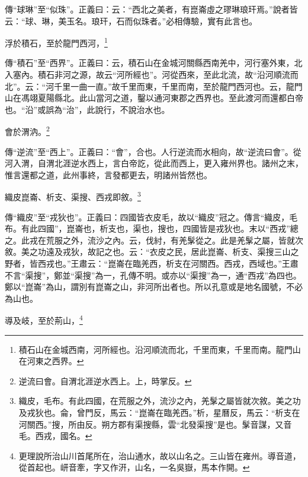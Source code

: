 {\noindent\zhuan{}\fzbyks 傳“球琳”至“似珠”。正義曰：云：“西北之美者，有崑崙虛之璆琳琅玕焉。”說者皆云：“球、琳，美玉名。琅玕，石而似珠者。”必相傳驗，實有此言也。 \par}

浮於積石，至於龍門西河，\footnote{積石山在金城西南，河所經也。沿河順流而北，千里而東，千里而南。龍門山在河東之西界。}

{\noindent\zhuan{}\fzbyks 傳“積石”至“西界”。正義曰：云，積石山在金城河關縣西南羌中，河行塞外東，北入塞內。積石非河之源，故云“河所經也”。河從西來，至此北流，故“沿河順流而北”。云：“河千里一曲一直。”故千里而東，千里而南，至於龍門西河也。云，龍門山在馮翊夏陽縣北。此山當河之道，鑿以通河東郡之西界也。至此渡河而還都白帝也。“沿”或誤為“治”，此說行，不說治水也。 \par}

會於渭汭。\footnote{逆流曰會。自渭北涯逆水西上。上，時掌反。}

{\noindent\zhuan{}\fzbyks 傳“逆流”至“西上”。正義曰：“會”，合也。人行逆流而水相向，故“逆流曰會”。從河入渭，自渭北涯逆水西上，言白帝訖，從此而西上，更入雍州界也。諸州之末，惟言還都之道，此州事終，言發都更去，明諸州皆然也。 \par}

織皮崑崙、析支、渠搜、西戎即敘。\footnote{織皮，毛布。有此四國，在荒服之外，流沙之內，羌髳之屬皆就次敘。美之功及戎狄也。侖，曾門反，馬云：“崑崙在臨羌西。”析，星曆反，馬云：“析支在河關西。”搜，所由反。朔方郡有渠搜縣，雲“北發渠搜”是也。髳音謀，又音毛。西戎，國名。}

{\noindent\zhuan{}\fzbyks 傳“織皮”至“戎狄也”。正義曰：四國皆衣皮毛，故以“織皮”冠之。傳言“織皮，毛布。有此四國”，崑崙也，析支也，渠也，搜也，四國皆是戎狄也。末以“西戎”總之。此戎在荒服之外，流沙之內。云，伐紂，有羌髳從之。此是羌髳之屬，皆就次敘。美之功遠及戎狄，故記之也。云：“衣皮之民，居此崑崙、析支、渠搜三山之野者，皆西戎也。”王肅云：“崑崙在臨羌西，析支在河關西。西戎，西域也。”王肅不言“渠搜”，鄭並“渠搜”為一，孔傳不明。或亦以“渠搜”為一，通“西戎”為四也。鄭以“崑崙”為山，謂別有崑崙之山，非河所出者也。所以孔意或是地名國號，不必為山也。 \par}

導及岐，至於荊山，\footnote{更理說所治山川首尾所在，治山通水，故以山名之。三山皆在雍州。導音道，從首起也。岍音牽，字又作汧，山名，一名吳嶽，馬本作開。}

